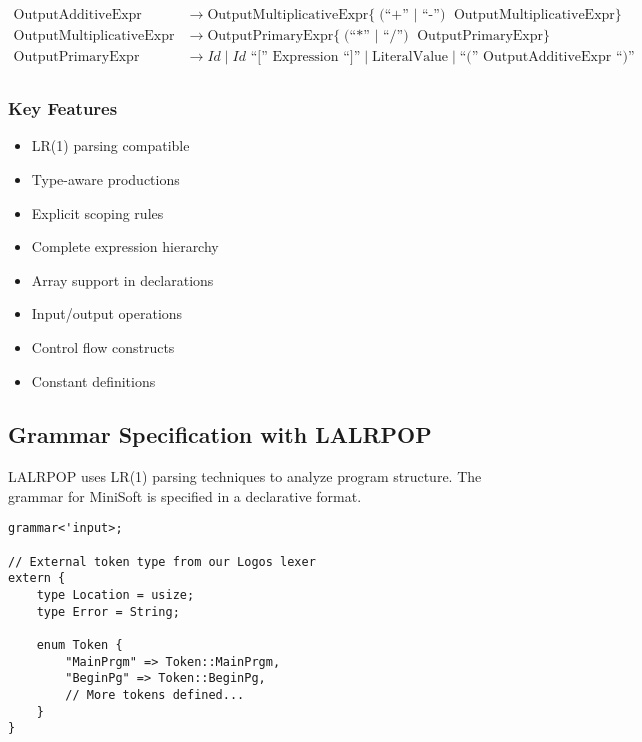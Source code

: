 \documentclass[12pt,a4paper]{article}
\begin{document}
\[\begin{array}{rl}
		\text{OutputAdditiveExpr}       & \rightarrow \text{OutputMultiplicativeExpr} \{ \text{(``+'' $\mid$ ``-'') } \text{OutputMultiplicativeExpr} \}                                                              \\

		\text{OutputMultiplicativeExpr} & \rightarrow \text{OutputPrimaryExpr} \{ \text{(``*'' $\mid$ ``/'') } \text{OutputPrimaryExpr} \}                                                                            \\

		\text{OutputPrimaryExpr}        & \rightarrow \mathit{Id} \mid \mathit{Id} \text{ ``['' } \text{Expression} \text{ ``]''} \mid \text{LiteralValue} \mid \text{``('' } \text{OutputAdditiveExpr} \text{ ``)''} \\
	\end{array}
\]
\normalsize

\subsubsection*{Key Features}
\begin{itemize}
	\item LR(1) parsing compatible
	\item Type-aware productions
	\item Explicit scoping rules
	\item Complete expression hierarchy
	\item Array support in declarations
	\item Input/output operations
	\item Control flow constructs
	\item Constant definitions
\end{itemize}


\subsection{Grammar Specification with LALRPOP}
LALRPOP uses LR(1) parsing techniques to analyze program structure. The grammar for MiniSoft is specified in a declarative format.

\begin{lstlisting}[caption={Grammar File Structure}]
grammar<'input>;

// External token type from our Logos lexer
extern {
    type Location = usize;
    type Error = String;

    enum Token {
        "MainPrgm" => Token::MainPrgm,
        "BeginPg" => Token::BeginPg,
        // More tokens defined...
    }
}
\end{lstlisting}
\end{document}
